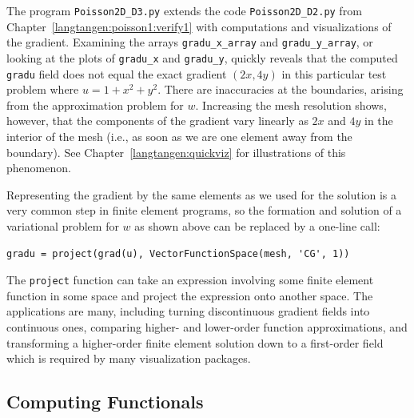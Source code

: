 The program {\fontsize{12pt}{12pt}\verb!Poisson2D_D3.py!} extends the
code {\fontsize{12pt}{12pt}\verb!Poisson2D_D2.py!} from Chapter~\ref{langtangen:poisson1:verify1}
with computations and visualizations of the gradient.
Examining the arrays {\fontsize{12pt}{12pt}\verb!gradu_x_array!}
and {\fontsize{12pt}{12pt}\verb!gradu_y_array!}, or looking at the plots of
{\fontsize{12pt}{12pt}\verb!gradu_x!} and
{\fontsize{12pt}{12pt}\verb!gradu_y!}, quickly reveals that
the computed {\fontsize{12pt}{12pt}\texttt{gradu}} field does not equal the exact
gradient $(2x, 4y)$ in this particular test problem where $u=1+x^2+y^2$.
There are inaccuracies at the boundaries, arising from the
approximation problem for $w$. Increasing the mesh resolution shows,
however, that the components of the gradient vary linearly as
$2x$ and $4y$ in
the interior of the mesh (i.e., as soon as we are one element away from
the boundary). See Chapter~\ref{langtangen:quickviz} for illustrations of
this phenomenon.

Representing the gradient by the same elements as we used for the
solution is a very common step in finite element programs, so the
formation and solution of a variational problem for $w$ as shown above
can be replaced by a one-line call:
\begin{Verbatim}[fontsize=\fontsize{10pt}{10pt},tabsize=8,baselinestretch=1.05,
fontfamily=tt,xleftmargin=7mm]
gradu = project(grad(u), VectorFunctionSpace(mesh, 'CG', 1))
\end{Verbatim}
\noindent
The {\fontsize{12pt}{12pt}\texttt{project}} function can take an expression involving some
finite element function in some space and project the expression onto
another space.
The applications are many, including turning discontinuous gradient
fields into continuous ones, comparing higher- and lower-order
function approximations, and transforming a higher-order finite element
solution down to a first-order field which is required by many
visualization packages.

\subsection{Computing Functionals}
\label{langtangen:poisson1:functionals}


